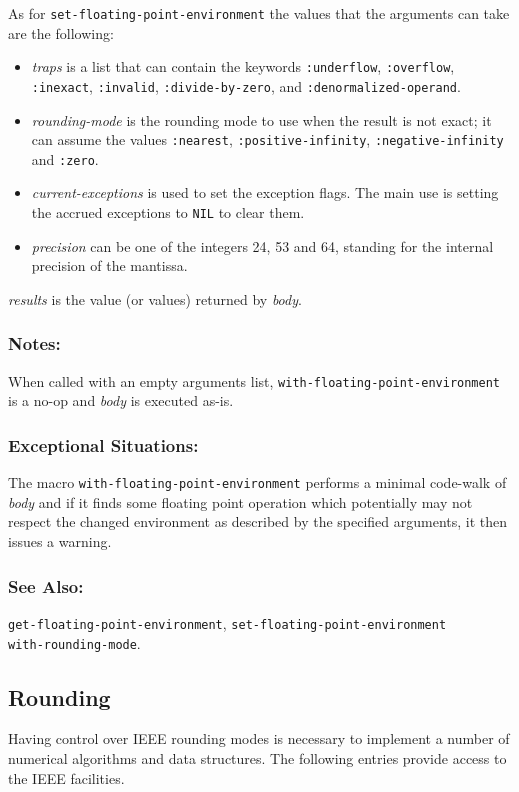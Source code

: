 \documentclass[10pt,fleqn]{article}
\newcommand{\code}[1]{\texttt{#1}}
\newcommand{\varname}[1]{\textit{#1}}
\newcommand{\DExceptional}{\subsubsection*{Exceptional Situations:}}
\newcommand{\DNotes}{\subsubsection*{Notes:}}
\newcommand{\DSeeAlso}{\subsubsection*{See Also:}}
\begin{document}
As for \code{set-floating-point-environment} the values that the arguments
can take are the following:

\begin{itemize}
\item \varname{traps} is a list that can contain the keywords
  \code{:underflow}, \code{:overflow}, \code{:inexact}, \code{:invalid},
  \code{:divide-by-zero}, and \code{:denormalized-operand}.

\item \varname{rounding-mode} is the rounding mode to use when the result is
  not exact; it can assume the values \code{:nearest},
  \code{:positive-infinity}, \code{:negative-infinity} and
  \code{:zero}.

\item \varname{current-exceptions} is used to set the exception flags. The
  main use is setting the accrued exceptions to \code{NIL} to clear
  them.

\item \varname{precision} can be one of the integers 24, 53 and 64,
  standing for the internal precision of the mantissa.
\end{itemize}



\noindent
\varname{results} is the value (or values) returned by \varname{body}.


\DNotes{}

When called with an empty arguments list,
\code{with-floating-point-environment} is a no-op and \varname{body}
is executed as-is.

\DExceptional{}

The macro \code{with-floating-point-environment} performs a minimal
code-walk of \varname{body} and if it finds some floating point
operation which potentially may not respect the changed environment as
described by the specified arguments, it then issues a warning.


\DSeeAlso{}

\code{get-floating-point-environment},
\code{set-floating-point-environment}\\
\code{with-rounding-mode}.



\subsection{Rounding}
\label{sect:rounding}

Having control over IEEE rounding modes is necessary to implement a
number of numerical algorithms and data structures. The following
entries provide access to the IEEE facilities.
\end{document}
